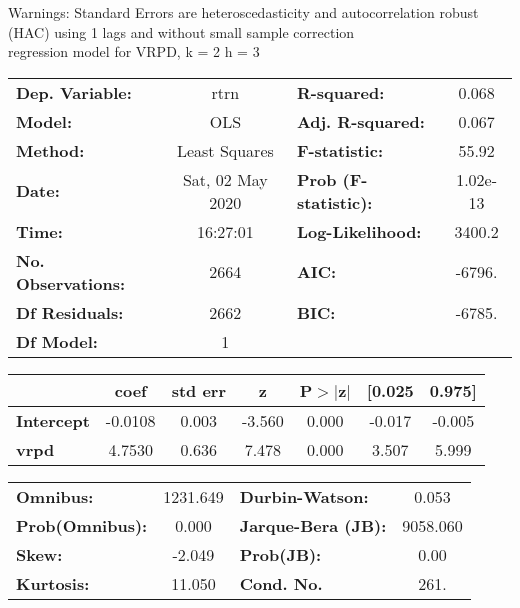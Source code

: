 Warnings: \newline
 [1] Standard Errors are heteroscedasticity and autocorrelation robust (HAC) using 1 lags and without small sample correction\\ 

regression model for VRPD, k = 2 h = 3\begin{center}
\begin{tabular}{lclc}
\toprule
\textbf{Dep. Variable:}    &       rtrn       & \textbf{  R-squared:         } &     0.068   \\
\textbf{Model:}            &       OLS        & \textbf{  Adj. R-squared:    } &     0.067   \\
\textbf{Method:}           &  Least Squares   & \textbf{  F-statistic:       } &     55.92   \\
\textbf{Date:}             & Sat, 02 May 2020 & \textbf{  Prob (F-statistic):} &  1.02e-13   \\
\textbf{Time:}             &     16:27:01     & \textbf{  Log-Likelihood:    } &    3400.2   \\
\textbf{No. Observations:} &        2664      & \textbf{  AIC:               } &    -6796.   \\
\textbf{Df Residuals:}     &        2662      & \textbf{  BIC:               } &    -6785.   \\
\textbf{Df Model:}         &           1      & \textbf{                     } &             \\
\bottomrule
\end{tabular}
\begin{tabular}{lcccccc}
                   & \textbf{coef} & \textbf{std err} & \textbf{z} & \textbf{P$> |$z$|$} & \textbf{[0.025} & \textbf{0.975]}  \\
\midrule
\textbf{Intercept} &      -0.0108  &        0.003     &    -3.560  &         0.000        &       -0.017    &       -0.005     \\
\textbf{vrpd}      &       4.7530  &        0.636     &     7.478  &         0.000        &        3.507    &        5.999     \\
\bottomrule
\end{tabular}
\begin{tabular}{lclc}
\textbf{Omnibus:}       & 1231.649 & \textbf{  Durbin-Watson:     } &    0.053  \\
\textbf{Prob(Omnibus):} &   0.000  & \textbf{  Jarque-Bera (JB):  } & 9058.060  \\
\textbf{Skew:}          &  -2.049  & \textbf{  Prob(JB):          } &     0.00  \\
\textbf{Kurtosis:}      &  11.050  & \textbf{  Cond. No.          } &     261.  \\
\bottomrule
\end{tabular}
\end{center}

